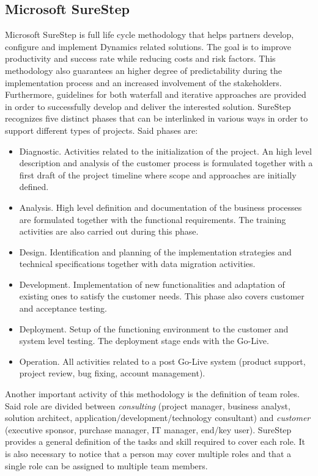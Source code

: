 \subsection{Microsoft SureStep}

Microsoft SureStep \cite{SureStepBook} is full life cycle methodology that helps partners develop, configure and implement Dynamics related solutions. The goal is to improve productivity and success rate while reducing costs and risk factors. This methodology also guarantees an higher degree of predictability during the implementation process and an increased involvement of the stakeholders. Furthermore, guidelines for both waterfall and iterative approaches  are provided in order to successfully develop and deliver the interested solution. SureStep recognizes five distinct phases that can be interlinked in various ways in order to support different types of projects. Said phases are: 

\begin{itemize}
    \item Diagnostic. Activities related to the initialization of the project. An high level description and analysis of the customer process is formulated together with a first draft of the project timeline where scope and approaches are initially defined. 
    \item Analysis. High level definition and documentation of the business processes are formulated together with the functional requirements. The training activities are also carried out during this phase.
    \item Design. Identification and planning of the implementation strategies and technical specifications together with data migration activities.
    \item Development. Implementation of new functionalities and adaptation of existing ones to satisfy the customer needs. This phase also covers customer and acceptance testing. 
    \item Deployment. Setup of the functioning environment to the customer and system level testing. The deployment stage ends with the Go-Live.
    \item Operation. All activities related to a post Go-Live system (product support, project review, bug fixing, account management).
\end{itemize}

Another important activity of this methodology is the definition of team roles. Said role are divided between \textit{consulting} (project manager, business analyst, solution architect, application/development/technology consultant) and \textit{customer} (executive sponsor, purchase manager, IT manager, end/key user). SureStep provides a general definition of the tasks and skill required to cover each role. It is also necessary to notice that a person may cover multiple roles and that a single role can be assigned to multiple team members. 

